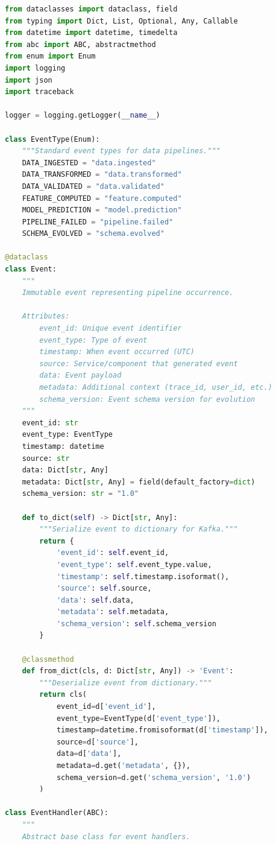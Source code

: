 \begin{lstlisting}[language=Python, caption={Event-Driven Pipeline Base Class}]
from dataclasses import dataclass, field
from typing import Dict, List, Optional, Any, Callable
from datetime import datetime, timedelta
from abc import ABC, abstractmethod
from enum import Enum
import logging
import json
import traceback

logger = logging.getLogger(__name__)

class EventType(Enum):
    """Standard event types for data pipelines."""
    DATA_INGESTED = "data.ingested"
    DATA_TRANSFORMED = "data.transformed"
    DATA_VALIDATED = "data.validated"
    FEATURE_COMPUTED = "feature.computed"
    MODEL_PREDICTION = "model.prediction"
    PIPELINE_FAILED = "pipeline.failed"
    SCHEMA_EVOLVED = "schema.evolved"

@dataclass
class Event:
    """
    Immutable event representing pipeline occurrence.

    Attributes:
        event_id: Unique event identifier
        event_type: Type of event
        timestamp: When event occurred (UTC)
        source: Service/component that generated event
        data: Event payload
        metadata: Additional context (trace_id, user_id, etc.)
        schema_version: Event schema version for evolution
    """
    event_id: str
    event_type: EventType
    timestamp: datetime
    source: str
    data: Dict[str, Any]
    metadata: Dict[str, Any] = field(default_factory=dict)
    schema_version: str = "1.0"

    def to_dict(self) -> Dict[str, Any]:
        """Serialize event to dictionary for Kafka."""
        return {
            'event_id': self.event_id,
            'event_type': self.event_type.value,
            'timestamp': self.timestamp.isoformat(),
            'source': self.source,
            'data': self.data,
            'metadata': self.metadata,
            'schema_version': self.schema_version
        }

    @classmethod
    def from_dict(cls, d: Dict[str, Any]) -> 'Event':
        """Deserialize event from dictionary."""
        return cls(
            event_id=d['event_id'],
            event_type=EventType(d['event_type']),
            timestamp=datetime.fromisoformat(d['timestamp']),
            source=d['source'],
            data=d['data'],
            metadata=d.get('metadata', {}),
            schema_version=d.get('schema_version', '1.0')
        )

class EventHandler(ABC):
    """
    Abstract base class for event handlers.


\end{lstlisting}
